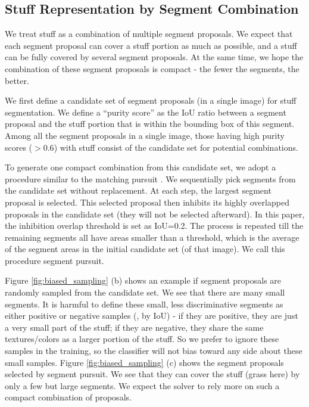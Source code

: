 \documentclass[10pt,twocolumn,letterpaper]{article}
\begin{document}
\subsection{Stuff Representation by Segment Combination}

We treat stuff as a combination of multiple segment proposals. We expect that each segment proposal can cover a stuff portion as much as possible, and a stuff can be fully covered by several segment proposals. At the same time, we hope the combination of these segment proposals is compact - the fewer the segments, the better.

We first define a candidate set of segment proposals (in a single image) for stuff segmentation.
We define a ``purity score'' as the IoU ratio between a segment proposal and the stuff portion that is within the bounding box of this segment. Among all the segment proposals in a single image, those having high purity scores ($>0.6$) with stuff consist of the candidate set for potential combinations.

To generate one compact combination from this candidate set, we adopt a procedure similar to the matching pursuit \cite{wu2010learning,mallat1993matching}. We sequentially pick segments from the candidate set without replacement. At each step, the largest segment proposal is selected. This selected proposal then inhibits its highly overlapped proposals in the candidate set (they will not be selected afterward). In this paper, the inhibition overlap threshold is set as IoU=0.2.
The process is repeated till the remaining segments all have areas smaller than a threshold, which is the average of the segment areas in the initial candidate set (of that image). We call this procedure segment pursuit.

Figure \ref{fig:biased_sampling} (b) shows an example if segment proposals are randomly sampled from the candidate set. We see that there are many small segments. It is harmful to define these small, less discriminative segments as either positive or negative samples (\eg, by IoU) - if they are positive, they are just a very small part of the stuff; if they are negative, they share the same textures/colors as a larger portion of the stuff. So we prefer to ignore these samples in the training, so the classifier will not bias toward any side about these small samples.
Figure \ref{fig:biased_sampling} (c) shows the segment proposals selected by segment pursuit. We see that they can cover the stuff (grass here) by only a few but large segments. We expect the solver to rely more on such a compact combination of proposals.
\end{document}
